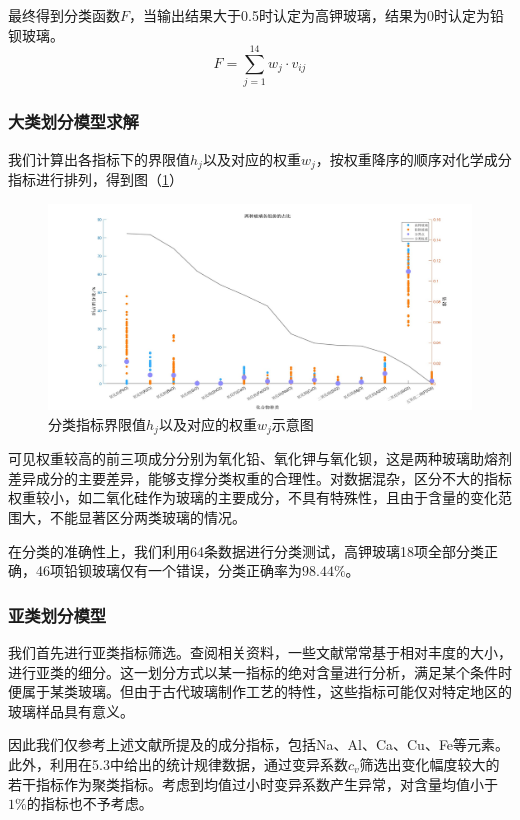 \documentclass{my_paper}
\begin{document}
最终得到分类函数$ F $，当输出结果大于0.5时认定为高钾玻璃，结果为0时认定为铅钡玻璃。
\begin{equation}
F = \sum\limits_{j=1}^{14} w_j \cdot v_{ij}
\label{F}
\end{equation}

\subsubsection{大类划分模型求解}
我们计算出各指标下的界限值$ h_j $以及对应的权重$w_j$，按权重降序的顺序对化学成分指标进行排列，得到图（\ref{hjtu}）
\begin {figure}[h]
\centering %
\includegraphics[width=\textwidth]{6.jpg}
\caption{分类指标界限值$ h_j $以及对应的权重$w_j$示意图} %
\label{hjtu}
\end {figure}
\newpage

可见权重较高的前三项成分分别为氧化铅、氧化钾与氧化钡，这是两种玻璃助熔剂差异成分的主要差异，能够支撑分类权重的合理性。对数据混杂，区分不大的指标权重较小，如二氧化硅作为玻璃的主要成分，不具有特殊性，且由于含量的变化范围大，不能显著区分两类玻璃的情况。

在分类的准确性上，我们利用64条数据进行分类测试，高钾玻璃18项全部分类正确，46项铅钡玻璃仅有一个错误，分类正确率为$ 98.44\% $。

\subsubsection{亚类划分模型}
我们首先进行亚类指标筛选。查阅相关资料，一些文献\cite{8,9}常常基于相对丰度的大小，进行亚类的细分。这一划分方式以某一指标的绝对含量进行分析，满足某个条件时便属于某类玻璃。但由于古代玻璃制作工艺的特性，这些指标可能仅对特定地区的玻璃样品具有意义。

因此我们仅参考上述文献所提及的成分指标，包括Na、Al、Ca、Cu、Fe等元素。此外，利用在5.3中给出的统计规律数据，通过变异系数$c_v$筛选出变化幅度较大的若干指标作为聚类指标。考虑到均值过小时变异系数产生异常，对含量均值小于$1\%$的指标也不予考虑。
\end{document}
